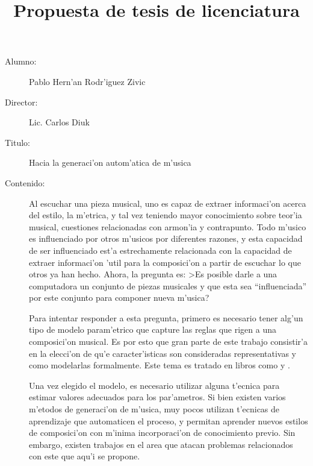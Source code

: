 \documentclass[a4paper,10pt]{article}
\title{Propuesta de tesis de licenciatura}
\begin{document}

\maketitle
 \begin{description}
  \item[Alumno:] Pablo Hern'an Rodr'iguez Zivic
  \item[Director:] Lic. Carlos Diuk
  \item[Titulo:] Hacia la generaci'on autom'atica de m'usica
  \item[Contenido:] Al escuchar una pieza musical, uno es capaz de extraer informaci'on acerca del 
	estilo, la m'etrica, y tal vez teniendo mayor conocimiento sobre teor'ia musical, cuestiones relacionadas 
	con armon'ia y contrapunto. Todo m'usico es influenciado por otros m'usicos por diferentes razones, 
	y esta capacidad de ser influenciado est'a estrechamente relacionada con la capacidad de extraer 
	informaci'on 'util para la composici'on a partir de escuchar lo que otros ya han hecho.
	Ahora, la pregunta es: >Es posible darle a una computadora un conjunto de piezas musicales y que esta sea 
	``influenciada'' por este conjunto para componer nueva m'usica?
    
    Para intentar responder a esta pregunta, primero es necesario tener alg'un
    tipo de modelo param'etrico que capture las reglas que rigen a una composici'on musical.
    Es por esto que gran parte de este trabajo consistir'a en la elecci'on de qu'e 
    caracter'isticas son consideradas representativas y como modelarlas formalmente. 
    Este tema es tratado en libros como \cite{Musimathics} y \cite{MuPr}.
    
    Una vez elegido el modelo, es necesario utilizar alguna t'ecnica para
    estimar valores adecuados para los par'ametros. Si bien existen varios m'etodos de 
    generaci'on de m'usica, muy pocos utilizan t'ecnicas de aprendizaje 
	que automaticen el proceso, y permitan aprender nuevos estilos de composici'on con m'inima
	incorporaci'on de conocimiento previo. Sin embargo, existen trabajos en el
    area que atacan problemas relacionados con este que aqu'i se propone. 


\end{description}
\end{document}
